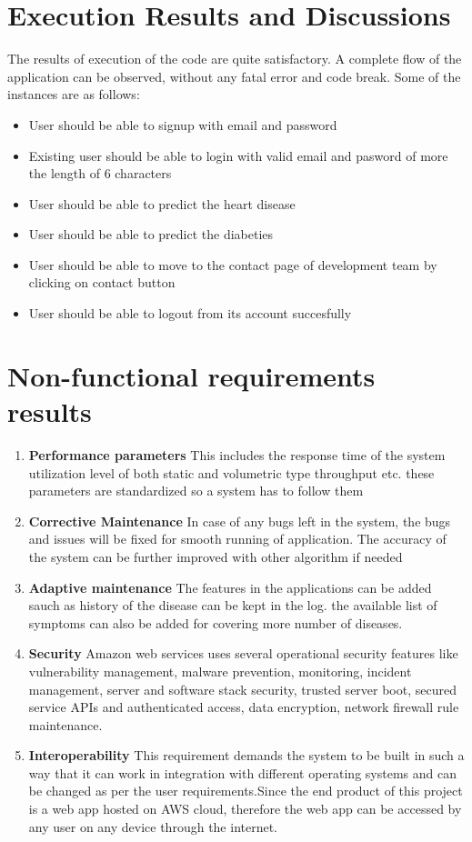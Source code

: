 \documentclass[oneside,12pt]{Classes/VTU}
\begin{document}
	\section{Execution Results and Discussions}
	The results of execution of the code are quite satisfactory. A complete flow of the application can be observed, without any fatal error and code break. Some of the
instances are as follows:
	\begin{itemize}
		\item User should be able to signup with email and password
		\item Existing user should be able to login with valid email and pasword of more the length of 6 characters
		\item User should be able to predict the heart disease 
		\item User should be able to predict the diabeties  
		\item User should be able to move to the contact page of development team by clicking on contact button 
		\item User should be able to logout from its account succesfully 
		
	\end{itemize}
	\section{Non-functional requirements results}
	\begin{enumerate}
		\item \textbf{Performance parameters} This includes the response time of the system utilization level of both static and volumetric type throughput etc. these parameters are standardized so a system has to follow them
		\item \textbf{Corrective Maintenance} In case of any bugs left in the system, the bugs and issues will be fixed for smooth running of application. The accuracy of the system can be further improved with other algorithm if needed
		\item \textbf{Adaptive maintenance} The features in the applications can be added sauch as history of the disease can be kept in the log. the available list of symptoms can also be added for covering more number of diseases.
		\item \textbf{Security} Amazon web services uses several operational security features like vulnerability management, malware prevention, monitoring, incident management, server and software stack security, trusted server boot, secured service APIs and authenticated access, data encryption, network firewall rule maintenance. 
		\item \textbf{Interoperability} This requirement demands the system to be built in such a way that it can work in integration with different operating systems and can be changed as per the user requirements.Since the end product of this project is a web app hosted on AWS cloud, therefore the web app can be accessed by any user on any device through the internet. 
	\end{enumerate}
	
\end{document}
